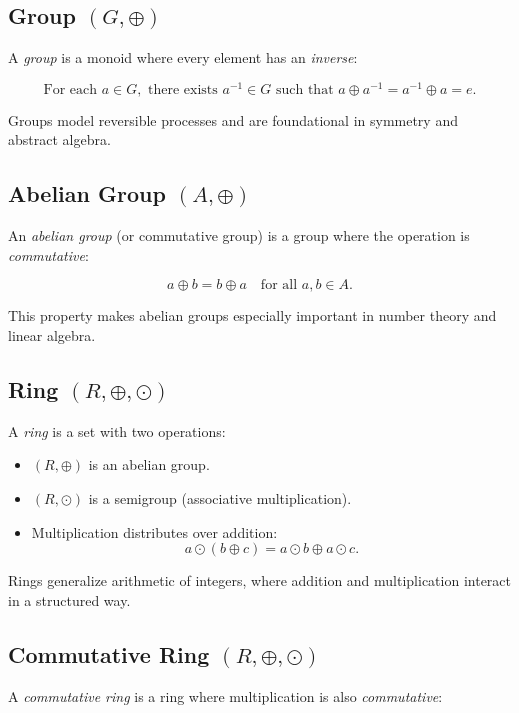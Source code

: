 \subsection{Group \texorpdfstring{\((G, \oplus)\)}{}}

A \emph{group} is a monoid where every element has an \emph{inverse}:

\[
\text{For each } a \in G, \text{ there exists } a^{-1} \in G \text{ such that } a \oplus a^{-1} = a^{-1} \oplus a = e.
\]

Groups model reversible processes and are foundational in symmetry and abstract algebra.

\subsection{Abelian Group \texorpdfstring{\((A, \oplus)\)}{}}

An \emph{abelian group} (or commutative group) is a group where the operation is \emph{commutative}:

\[
a \oplus b = b \oplus a \quad \text{for all } a, b \in A.
\]

This property makes abelian groups especially important in number theory and linear algebra.

\subsection{Ring \texorpdfstring{\((R, \oplus, \odot)\)}{}}

A \emph{ring} is a set with two operations:

\begin{itemize}[label=\(-\)]
  \item \((R, \oplus)\) is an abelian group.
  \item \((R, \odot)\) is a semigroup (associative multiplication).
  \item Multiplication distributes over addition:
  \[
  a \odot (b \oplus c) = a \odot b \oplus a \odot c.
  \]
\end{itemize}

Rings generalize arithmetic of integers, where addition and multiplication interact in a structured way.

\subsection{Commutative Ring \texorpdfstring{\((R, \oplus, \odot)\)}{}}

A \emph{commutative ring} is a ring where multiplication is also \emph{commutative}:

